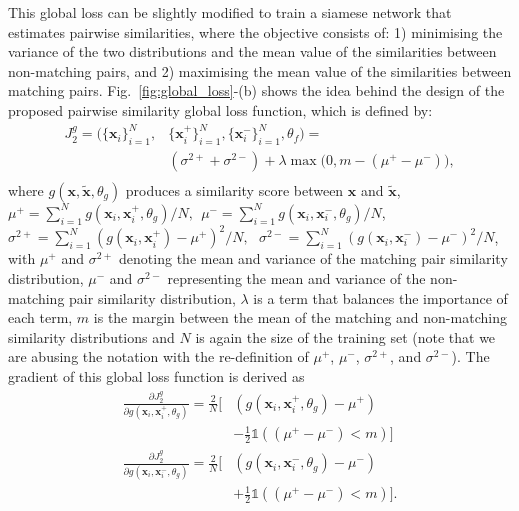 \documentclass[10pt,twocolumn,letterpaper]{article}
\begin{document}
This global loss can be slightly modified to train a siamese network that estimates pairwise similarities, where the objective consists of: 1) minimising
the variance of the two distributions and the mean value of the similarities between non-matching pairs, and 2) maximising the mean value of the similarities between matching pairs.  Fig.~\ref{fig:global_loss}-(b) shows the idea behind the design of the proposed pairwise similarity global loss function, which is defined by:
\begin{equation}
\begin{split}
J_2^g = ( \{ \mathbf{x}_i \}_{i=1}^N ,& \{ \mathbf{x}_i^+ \}_{i=1}^N, \{ \mathbf{x}_i^-\}_{i=1}^N , \theta_f ) = \\ &(\sigma^{2+}+\sigma^{2-})+\lambda \max\big(0, m - (\mu^+ - \mu^-) \big),\\
\end{split}
\label{eq:loss_global_siamese}
\end{equation}
where $g(\mathbf{x},\tilde{\mathbf{x}},\theta_g)$ produces a similarity score between $\mathbf{x}$ and $\tilde{\mathbf{x}}$, $\mu^+ = \sum_{i=1}^N g(\mathbf{x}_i,\mathbf{x}_i^+,\theta_g)/N,~~ \mu^- = \sum_{i=1}^N g(\mathbf{x}_i,\mathbf{x}_i^-,\theta_g)/N $, ~~
$\sigma^{2+} = \sum_{i=1}^N(g(\mathbf{x}_i,\mathbf{x}_i^+) -\mu^+)^2/N,~~~   \sigma^{2-} = \sum_{i=1}^N(g(\mathbf{x}_i,\mathbf{x}_i^-) - \mu^-)^2/N$, with $\mu^+$ and $\sigma^{2+}$ denoting the mean and variance of the matching pair similarity distribution,  
$\mu^-$ and $\sigma^{2-}$ representing the mean and variance of the non-matching pair similarity distribution, 
$\lambda$ is a term that balances the importance of each term, $m$ is the margin between the mean of the matching and non-matching similarity distributions and
$N$ is again the size of the training set (note that we are abusing the notation with the re-definition of $\mu^+$, $\mu^-$, $\sigma^{2+}$, and $\sigma^{2-}$).  The gradient of this global loss function is derived as
\begin{equation}
 \begin{split}
  \frac{\partial  J_2^g}{\partial  g(\mathbf{x}_i,\mathbf{x}_i^+,\theta_g)} = \frac{2}{N}\big[ &
(g(\mathbf{x}_i,\mathbf{x}_i^+,\theta_g) -\mu^+)\\&-\frac{1}{2}\mathds{1}((\mu^+ -\mu^-) < m)\big]\\
  \frac{\partial  J_2^g}{\partial  g(\mathbf{x}_i,\mathbf{x}_i^-,\theta_g)} = \frac{2}{N}\big[& 
(g(\mathbf{x}_i,\mathbf{x}_i^-,\theta_g) -\mu^-)\\&+\frac{1}{2}\mathds{1}((\mu^+ -\mu^-) < m)\big].\\
 \end{split}
 \label{eq:loss_global_siamese_gradient}
\end{equation}
\end{document}
